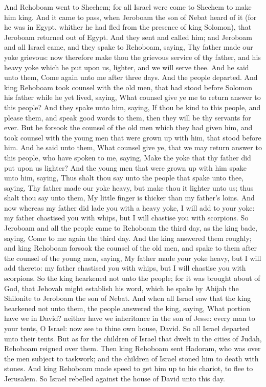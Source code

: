 And Rehoboam went to Shechem; for all Israel were come to Shechem to make him king. And it came to pass, when Jeroboam the son of Nebat heard of it (for he was in Egypt, whither he had fled from the presence of king Solomon), that Jeroboam returned out of Egypt. And they sent and called him; and Jeroboam and all Israel came, and they spake to Rehoboam, saying, Thy father made our yoke grievous: now therefore make thou the grievous service of thy father, and his heavy yoke which he put upon us, lighter, and we will serve thee. And he said unto them, Come again unto me after three days. And the people departed.  And king Rehoboam took counsel with the old men, that had stood before Solomon his father while he yet lived, saying, What counsel give ye me to return answer to this people? And they spake unto him, saying, If thou be kind to this people, and please them, and speak good words to them, then they will be thy servants for ever. But he forsook the counsel of the old men which they had given him, and took counsel with the young men that were grown up with him, that stood before him. And he said unto them, What counsel give ye, that we may return answer to this people, who have spoken to me, saying, Make the yoke that thy father did put upon us lighter? And the young men that were grown up with him spake unto him, saying, Thus shalt thou say unto the people that spake unto thee, saying, Thy father made our yoke heavy, but make thou it lighter unto us; thus shalt thou say unto them, My little finger is thicker than my father’s loins. And now whereas my father did lade you with a heavy yoke, I will add to your yoke: my father chastised you with whips, but I will chastise you with scorpions.  So Jeroboam and all the people came to Rehoboam the third day, as the king bade, saying, Come to me again the third day. And the king answered them roughly; and king Rehoboam forsook the counsel of the old men, and spake to them after the counsel of the young men, saying, My father made your yoke heavy, but I will add thereto: my father chastised you with whips, but I will chastise you with scorpions. So the king hearkened not unto the people; for it was brought about of God, that Jehovah might establish his word, which he spake by Ahijah the Shilonite to Jeroboam the son of Nebat.  And when all Israel saw that the king hearkened not unto them, the people answered the king, saying, What portion have we in David? neither have we inheritance in the son of Jesse: every man to your tents, O Israel: now see to thine own house, David. So all Israel departed unto their tents. But as for the children of Israel that dwelt in the cities of Judah, Rehoboam reigned over them. Then king Rehoboam sent Hadoram, who was over the men subject to taskwork; and the children of Israel stoned him to death with stones. And king Rehoboam made speed to get him up to his chariot, to flee to Jerusalem. So Israel rebelled against the house of David unto this day. 

